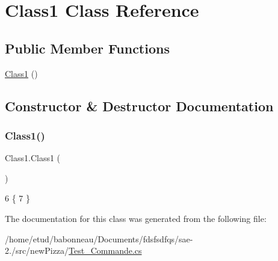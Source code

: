 \hypertarget{classClass1}{}\section{Class1 Class Reference}
\label{classClass1}
\subsection*{Public Member Functions}
\begin{DoxyCompactItemize}
\item 
\hyperlink{classClass1_a634a95dbd72abcd30bc42517ced333c1}{Class1} ()
\end{DoxyCompactItemize}


\subsection{Constructor \& Destructor Documentation}
\mbox{\label{classClass1_a634a95dbd72abcd30bc42517ced333c1}} 
\subsubsection{\texorpdfstring{Class1()}{Class1()}}
{\footnotesize\ttfamily Class1.\+Class1 (\begin{DoxyParamCaption}{ }\end{DoxyParamCaption})\hspace{0.3cm}{\ttfamily [inline]}}


\begin{DoxyCode}
6     \{
7     \}
\end{DoxyCode}


The documentation for this class was generated from the following file\+:\begin{DoxyCompactItemize}
\item 
/home/etud/babonneau/\+Documents/fdsfsdfqs/sae-\/2./src/new\+Pizza/\hyperlink{Test__Commande_8cs}{Test\+\_\+\+Commande.\+cs}\end{DoxyCompactItemize}
